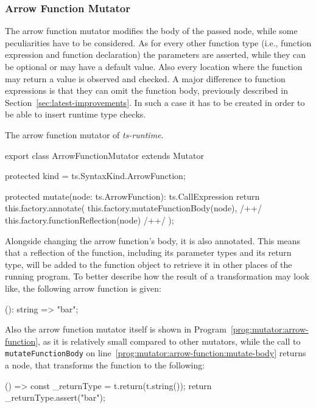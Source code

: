 \subsubsection{Arrow Function Mutator}
  
The arrow function mutator modifies the body of the passed node, while some peculiarities have to be considered. As for every other function type (i.e., function expression and function declaration) the parameters are asserted, while they can be optional or may have a default value. Also every location where the function may return a value is observed and checked. A major difference to function expressions is that they can omit the function body, previously described in Section~\ref{sec:latest-improvements}. In such a case it has to be created in order to be able to insert runtime type checks.
\begin{program}
\caption{The arrow function mutator of \emph{ts-runtime}.}
\label{prog:mutator:arrow-function}
\begin{JsCode}
export class ArrowFunctionMutator extends Mutator {

  protected kind = ts.SyntaxKind.ArrowFunction;

  protected mutate(node: ts.ArrowFunction): ts.CallExpression {
    return this.factory.annotate(
      this.factory.mutateFunctionBody(node), /+\label{prog:mutator:arrow-function:mutate-body}+/
      this.factory.functionReflection(node) /+\label{prog:mutator:arrow-function:reflect}+/
    );
  }

}
\end{JsCode}
\end{program}
Alongside changing the arrow function's body, it is also annotated. This means that a reflection of the function, including its parameter types and its return type, will be added to the function object to retrieve it in other places of the running program. To better describe how the result of a transformation may look like, the following arrow function is given:
\begin{JsCode}[numbers=none]
(): string => "bar";
\end{JsCode}
Also the arrow function mutator itself is shown in Program~\ref{prog:mutator:arrow-function}, as it is relatively small compared to other mutators, while the call to \texttt{mutateFunctionBody} on line~\ref{prog:mutator:arrow-function:mutate-body} returns a node, that transforms the function to the following:
\begin{JsCode}[numbers=none]
() => {
  const _returnType = t.return(t.string());
  return _returnType.assert("bar");
}
\end{JsCode}
